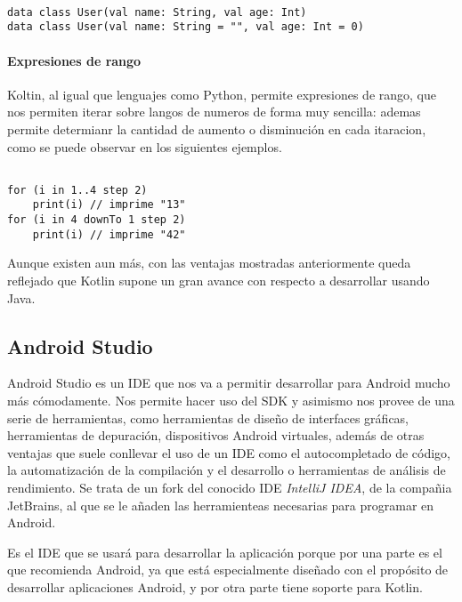 \begin{verbatim}

data class User(val name: String, val age: Int)
data class User(val name: String = "", val age: Int = 0)

\end{verbatim}

\paragraph{Expresiones de rango}

Koltin, al igual que lenguajes como Python, permite expresiones de rango, que nos permiten iterar sobre langos de numeros de forma muy sencilla: ademas permite determianr la cantidad de aumento o disminución en cada itaracion, como se puede observar en los siguientes ejemplos.

\begin{verbatim}

for (i in 1..4 step 2) 
	print(i) // imprime "13"
for (i in 4 downTo 1 step 2)
	print(i) // imprime "42"

\end{verbatim}

Aunque existen aun más, con las ventajas mostradas anteriormente queda reflejado que Kotlin supone un gran avance con respecto a desarrollar usando Java.

\subsection{Android Studio}

Android Studio es un IDE que nos va a permitir desarrollar para Android mucho más cómodamente. Nos permite hacer uso del SDK y asimismo nos provee de una serie de herramientas, como herramientas de diseño de interfaces gráficas, herramientas de depuración, dispositivos Android virtuales, además de otras ventajas que suele conllevar el uso de un IDE como el autocompletado de código, la automatización de la compilación y el desarrollo o herramientas de análisis de rendimiento. Se trata de un fork del conocido IDE \textit{IntelliJ IDEA}, de la compañia JetBrains, al que se le añaden las herramienteas necesarias para programar en Android.

Es el IDE que se usará para desarrollar la aplicación porque por una parte es el que recomienda Android, ya que está especialmente diseñado con el propósito de desarrollar aplicaciones Android, y por otra parte tiene soporte para Kotlin.

